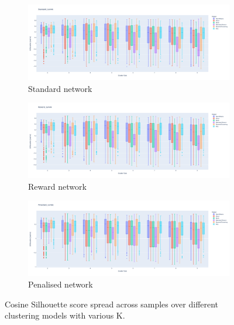 \begin{figure}[!htb]
    \thispagestyle{plain}
    \centering
    \begin{subfigure}{1.0\linewidth}
        \centering
        \includegraphics[width=1.0\textwidth,height=0.17\textheight]{Sections/Network_I/Resources/P0/Standard_tum4k_sill_spread.png}
        \caption{Standard network}
    \end{subfigure} %

    \begin{subfigure}{1.0\linewidth}
        \centering
        \includegraphics[width=1.0\textwidth,height=0.17\textheight]{Sections/Network_I/Resources/P0/Reward_tum4k_sill_spread.png}
        \caption{Reward network}
    \end{subfigure}
    
    \begin{subfigure}{1.0\linewidth}
        \centering
        \includegraphics[width=1.0\textwidth,height=0.17\textheight]{Sections/Network_I/Resources/P0/Penalised_tum4k_sill_spread.png}      
        \caption{Penalised network}
    \end{subfigure}
    \caption{Cosine Silhouette score spread across samples over different clustering models with various K.}
    \label{fig:N_I:p0_sillhouette_spread}
\end{figure}


